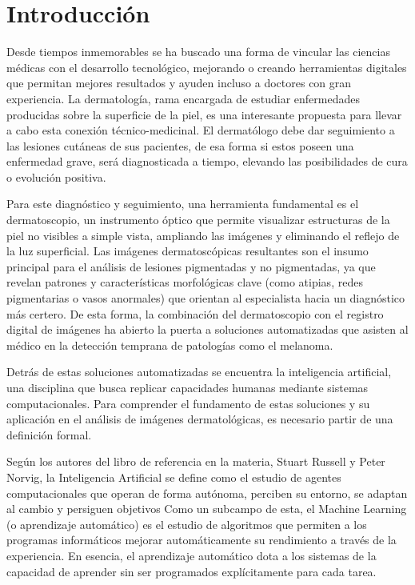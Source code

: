 \chapter{Introducci\'on}
Desde tiempos inmemorables se ha buscado una forma de vincular las ciencias m\'edicas con
el desarrollo tecnol\'ogico, mejorando o creando herramientas digitales que permitan mejores
resultados y ayuden incluso a doctores con gran experiencia. La dermatolog\'ia, rama encargada 
de estudiar enfermedades producidas sobre la superficie de la piel, es una interesante propuesta 
para llevar a cabo esta conexi\'on t\'ecnico-medicinal. El dermat\'ologo debe dar seguimiento
a las lesiones cut\'aneas de sus pacientes, de esa forma si estos poseen una enfermedad 
grave, ser\'a diagnosticada a tiempo, elevando las posibilidades de cura o evoluci\'on positiva.

Para este diagn\'ostico y seguimiento, una herramienta fundamental es el dermatoscopio, un instrumento 
\'optico que permite visualizar estructuras de la piel no visibles a simple vista, 
ampliando las im\'agenes y eliminando el reflejo de la luz superficial. Las im\'agenes 
dermatosc\'opicas resultantes son el insumo principal para el an\'alisis de lesiones 
pigmentadas y no pigmentadas, ya que revelan patrones y caracter\'isticas morfol\'ogicas 
clave (como atipias, redes pigmentarias o vasos anormales) que orientan al especialista 
hacia un diagn\'ostico m\'as certero. De esta forma, la combinaci\'on del dermatoscopio 
con el registro digital de im\'agenes ha abierto la puerta a soluciones automatizadas 
que asisten al m\'edico en la detecci\'on temprana de patolog\'ias como el melanoma.

Detrás de estas soluciones automatizadas se encuentra la inteligencia artificial, 
una disciplina que busca replicar capacidades humanas mediante sistemas computacionales. 
Para comprender el fundamento de estas soluciones y su aplicación en el análisis de imágenes dermatológicas, 
es necesario partir de una definición formal.

Según los autores del libro de referencia en la materia, Stuart Russell y Peter Norvig, 
la Inteligencia Artificial\cite{inteligenciaArtificial} se define como el estudio de agentes computacionales que operan 
de forma autónoma, perciben su entorno, se adaptan al cambio y persiguen objetivos
Como un subcampo de esta, el Machine Learning (o aprendizaje automático) es el estudio 
de algoritmos que permiten a los programas informáticos mejorar automáticamente su 
rendimiento a través de la experiencia\cite{machineLearning}. En esencia, el aprendizaje automático dota a los 
sistemas de la capacidad de aprender sin ser programados explícitamente para cada tarea.

